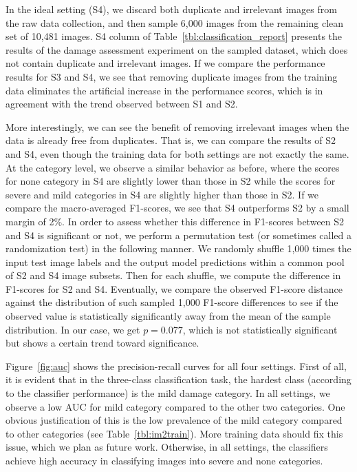 \documentclass{iscram}
\begin{document}
In the ideal setting (S4), we discard both duplicate and irrelevant images from the raw data collection, and then sample 6,000 images from the remaining clean set of 10,481 images. S4 column of Table~\ref{tbl:classification_report} presents the results of the damage assessment experiment on the sampled dataset, which does not contain duplicate and irrelevant images. If we compare the performance results for S3 and S4, we see that removing duplicate images from the training data eliminates the artificial increase in the performance scores, which is in agreement with the trend observed between S1 and S2.

More interestingly, we can see the benefit of removing irrelevant images when the data is already free from duplicates. That is, we can compare the results of S2 and S4, even though the training data for both settings are not exactly the same. At the category level, we observe a similar behavior as before, where the scores for none category in S4 are slightly lower than those in S2 while the scores for severe and mild categories in S4 are slightly higher than those in S2. If we compare the macro-averaged F1-scores, we see that S4 outperforms S2 by a small margin of 2\%. In order to assess whether this difference in F1-scores between S2 and S4 is significant or not, we perform a permutation test (or sometimes called a randomization test) in the following manner. We randomly shuffle 1,000 times the input test image labels and the output model predictions within a common pool of S2 and S4 image subsets. Then for each shuffle, we compute the difference in F1-scores for S2 and S4. Eventually, we compare the observed F1-score distance against the distribution of such sampled 1,000 F1-score differences to see if the observed value is statistically significantly away from the mean of the sample distribution. In our case, we get $p=0.077$, which is not statistically significant but shows a certain trend toward significance.

Figure~\ref{fig:auc} shows the precision-recall curves for all four settings. First of all, it is evident that in the three-class classification task, the hardest class (according to the classifier performance) is the mild damage category. In all settings, we observe a low AUC for mild category compared to the other two categories. One obvious justification of this is the low prevalence of the mild category compared to other categories (see Table~\ref{tbl:im2train}). More training data should fix this issue, which we plan as future work. Otherwise, in all settings, the classifiers achieve high accuracy in classifying images into severe and none categories.
\end{document}
